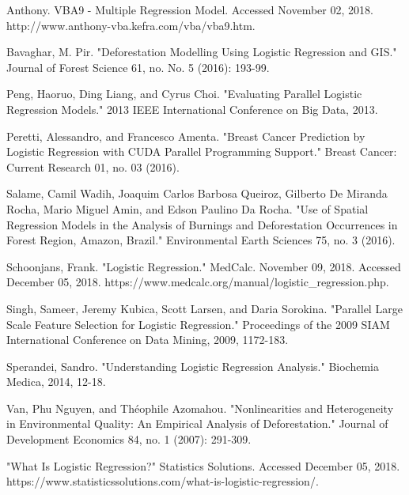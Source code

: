 \documentclass[letterpaper, 10 pt, conference]{ieeeconf}  %
\begin{document}
\begin{thebibliography}{99}

 Anthony. VBA9 - Multiple Regression Model. Accessed November 02, 2018. http://www.anthony-vba.kefra.com/vba/vba9.htm.

 Bavaghar, M. Pir. "Deforestation Modelling Using Logistic Regression and GIS." Journal of Forest Science 61, no. No. 5 (2016): 193-99. 

 Peng, Haoruo, Ding Liang, and Cyrus Choi. "Evaluating Parallel Logistic Regression Models." 2013 IEEE International Conference on Big Data, 2013. 

 Peretti, Alessandro, and Francesco Amenta. "Breast Cancer Prediction by Logistic Regression with CUDA Parallel Programming Support." Breast Cancer: Current Research 01, no. 03 (2016).

 Salame, Camil Wadih, Joaquim Carlos Barbosa Queiroz, Gilberto De Miranda Rocha, Mario Miguel Amin, and Edson Paulino Da Rocha. "Use of Spatial Regression Models in the Analysis of Burnings and Deforestation Occurrences in Forest Region, Amazon, Brazil." Environmental Earth Sciences 75, no. 3 (2016). 

 Schoonjans, Frank. "Logistic Regression." MedCalc. November 09, 2018. Accessed December 05, 2018. https://www.medcalc.org/manual/logistic\_regression.php.

 Singh, Sameer, Jeremy Kubica, Scott Larsen, and Daria Sorokina. "Parallel Large Scale Feature Selection for Logistic Regression." Proceedings of the 2009 SIAM International Conference on Data Mining, 2009, 1172-183. 

 Sperandei, Sandro. "Understanding Logistic Regression Analysis." Biochemia Medica, 2014, 12-18.

 Van, Phu Nguyen, and Théophile Azomahou. "Nonlinearities and Heterogeneity in Environmental Quality: An Empirical Analysis of Deforestation." Journal of Development Economics 84, no. 1 (2007): 291-309. 

 "What Is Logistic Regression?" Statistics Solutions. Accessed December 05, 2018. https://www.statisticssolutions.com/what-is-logistic-regression/.

\end{thebibliography}
\end{document}
